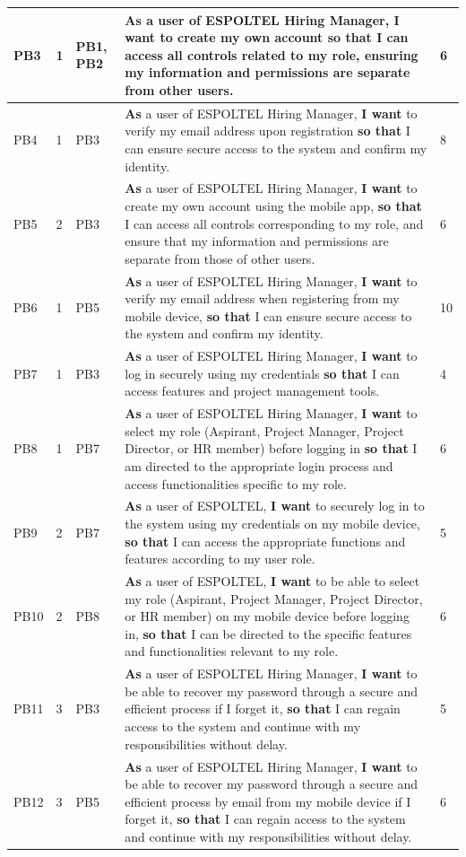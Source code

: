 \documentclass{scrreprt}
\begin{document}
\begin{longtable}{|p{0.8cm}|p{1.5cm}|p{2.5cm}|p{8cm}|p{2cm}|}
	PB3 & 1 & PB1, PB2 & \textbf{As} a user of ESPOLTEL Hiring Manager, \textbf{I want} to create my own account \textbf{so that} I can access all controls related to my role, ensuring my information and permissions are separate from other users. & 6 \\ \hline
	PB4 & 1 & PB3 & \textbf{As} a user of ESPOLTEL Hiring Manager, \textbf{I want} to verify my email address upon registration \textbf{so that} I can ensure secure access to the system and confirm my identity. & 8 \\ \hline
	PB5 & 2 & PB3 & \textbf{As} a user of ESPOLTEL Hiring Manager, \textbf{I want} to create my own account using the mobile app, \textbf{so that} I can access all controls corresponding to my role, and ensure that my information and permissions are separate from those of other users. & 6 \\ \hline
	PB6 & 1 & PB5 & \textbf{As} a user of ESPOLTEL Hiring Manager, \textbf{I want} to verify my email address when registering from my mobile device, \textbf{so that} I can ensure secure access to the system and confirm my identity. & 10 \\ \hline
	PB7 & 1 & PB3 & \textbf{As} a user of ESPOLTEL Hiring Manager, \textbf{I want} to log in securely using my credentials \textbf{so that} I can access features and project management tools. & 4\\ \hline
	PB8 & 1 & PB7 & \textbf{As} a user of ESPOLTEL Hiring Manager, \textbf{I want} to select my role (Aspirant, Project Manager, Project Director, or HR member) before logging in \textbf{so that} I am directed to the appropriate login process and access functionalities specific to my role. & 6 \\ \hline
	PB9 & 2 & PB7 & \textbf{As} a user of ESPOLTEL, \textbf{I want} to securely log in to the system using my credentials on my mobile device, \textbf{so that} I can access the appropriate functions and features according to my user role. & 5 \\ \hline
	PB10 & 2 & PB8 & \textbf{As} a user of ESPOLTEL, \textbf{I want} to be able to select my role (Aspirant, Project Manager, Project Director, or HR member) on my mobile device before logging in, \textbf{so that} I can be directed to the specific features and functionalities relevant to my role. &  6 \\ \hline
	PB11 & 3 & PB3 & \textbf{As} a user of ESPOLTEL Hiring Manager, \textbf{I want} to be able to recover my password through a secure and efficient process if I forget it, \textbf{so that} I can regain access to the system and continue with my responsibilities without delay. & 5 \\ \hline
	PB12 & 3 & PB5 & \textbf{As} a user of ESPOLTEL Hiring Manager, \textbf{I want} to be able to recover my password through a secure and efficient process by email from my mobile device if I forget it, \textbf{so that} I can regain access to the system and continue with my responsibilities without delay. & 6 \\ \hline
	

\end{longtable}
\end{document}
